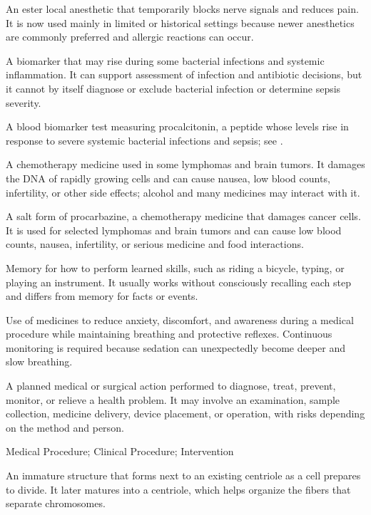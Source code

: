  An ester local anesthetic that temporarily blocks nerve signals and reduces pain. It is now used mainly in limited or historical settings because newer anesthetics are commonly preferred and allergic reactions can occur.

 A biomarker that may rise during some bacterial infections and systemic inflammation. It can support
assessment of infection and antibiotic decisions, but it cannot by itself diagnose or
exclude bacterial infection or determine sepsis severity.

 A blood biomarker test measuring procalcitonin, a peptide whose levels rise in response to severe systemic bacterial infections and sepsis; see .

 A chemotherapy medicine used in some lymphomas and brain tumors. It damages the DNA of rapidly growing cells and can cause nausea, low blood counts, infertility, or other side effects; alcohol and many medicines may interact with it.

 A salt form of procarbazine, a chemotherapy medicine that damages cancer cells. It is used for selected lymphomas and brain tumors and can cause low blood counts, nausea, infertility, or serious medicine and food interactions.

 Memory for how to perform learned skills, such as riding a bicycle, typing, or playing an instrument. It usually works without consciously recalling each step and differs from memory for facts or events.

 Use of medicines to reduce anxiety, discomfort, and awareness during a medical procedure while maintaining breathing and protective reflexes. Continuous monitoring is required because sedation can unexpectedly become deeper and slow breathing.

 A planned medical or surgical action performed to diagnose, treat, prevent, monitor, or relieve a health problem. It may involve an examination, sample collection, medicine delivery, device placement, or operation, with risks depending on the method and person.

\synonyms
Medical Procedure; Clinical Procedure; Intervention

 An immature structure that forms next to an existing centriole as a cell prepares to divide. It later matures into a centriole, which helps organize the fibers that separate chromosomes.

